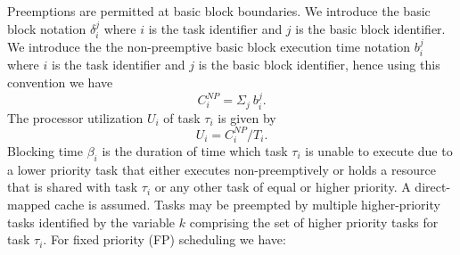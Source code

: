 \noindent
Preemptions are permitted at basic block boundaries.  We introduce the basic block notation \begin{math}\delta_{i}^{j}\end{math} where $i$ is the task identifier and $j$ is the basic block identifier. We introduce the the non-preemptive basic block execution time notation \begin{math}b_{i}^{j}\end{math} where $i$ is the task identifier and $j$ is the basic block identifier, hence using this convention we have
\begin{equation}\label{eqn:c-np2}
    C_{i}^{NP} = \Sigma_{j}\ b_{i}^{j}.
\end{equation}
\noindent
The processor utilization \begin{math}U_{i}\end{math} of task \begin{math}\tau_{i}\end{math} is given by
\begin{equation}\label{eqn:u-task}
    U_{i} = C_{i}^{NP}/T_{i}.
\end{equation}
\noindent
Blocking time \begin{math}\beta_{i}\end{math} is the duration of time which task \begin{math}\tau_{i}\end{math} is unable to execute due to a lower priority task that either executes non-preemptively or holds a resource that is shared with task \begin{math}\tau_{i}\end{math} or any other task of equal or higher priority.
A direct-mapped cache is assumed. Tasks may be preempted by multiple higher-priority tasks identified by the variable $k$ comprising the set of higher priority tasks for task \begin{math}\tau_{i}\end{math}. For fixed priority (FP) scheduling we have:
